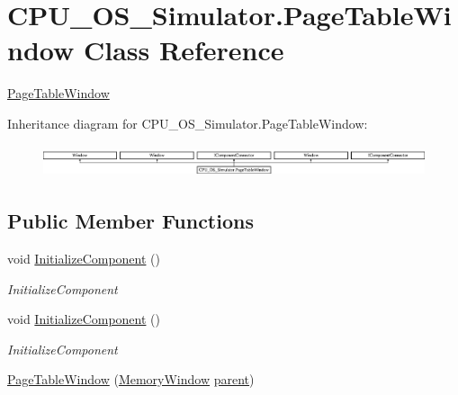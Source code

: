 \hypertarget{class_c_p_u___o_s___simulator_1_1_page_table_window}{}\section{C\+P\+U\+\_\+\+O\+S\+\_\+\+Simulator.\+Page\+Table\+Window Class Reference}
\label{class_c_p_u___o_s___simulator_1_1_page_table_window}


\hyperlink{class_c_p_u___o_s___simulator_1_1_page_table_window}{Page\+Table\+Window}  


Inheritance diagram for C\+P\+U\+\_\+\+O\+S\+\_\+\+Simulator.\+Page\+Table\+Window\+:\begin{figure}[H]
\begin{center}
\leavevmode
\includegraphics[height=0.945148cm]{class_c_p_u___o_s___simulator_1_1_page_table_window}
\end{center}
\end{figure}
\subsection*{Public Member Functions}
\begin{DoxyCompactItemize}
\item 
void \hyperlink{class_c_p_u___o_s___simulator_1_1_page_table_window_aac86b3b08e7e32708ac357042af6cbb2}{Initialize\+Component} ()
\begin{DoxyCompactList}\small\item\em Initialize\+Component \end{DoxyCompactList}\item 
void \hyperlink{class_c_p_u___o_s___simulator_1_1_page_table_window_aac86b3b08e7e32708ac357042af6cbb2}{Initialize\+Component} ()
\begin{DoxyCompactList}\small\item\em Initialize\+Component \end{DoxyCompactList}\item 
\hyperlink{class_c_p_u___o_s___simulator_1_1_page_table_window_a7d71ad4194ceafa3573e5f65e8dbe90a}{Page\+Table\+Window} (\hyperlink{class_c_p_u___o_s___simulator_1_1_memory_window}{Memory\+Window} \hyperlink{class_c_p_u___o_s___simulator_1_1_page_table_window_a1903e0b83820829549f74207cd209337}{parent})
\end{DoxyCompactItemize}
